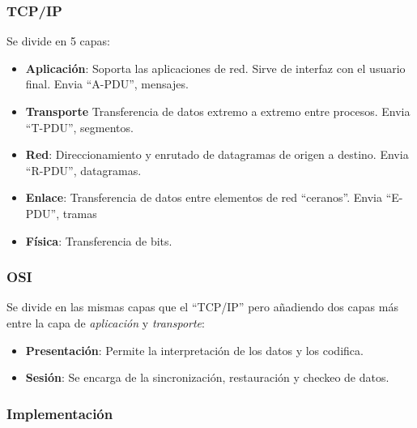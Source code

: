 \subsubsection{TCP/IP}
\noindent Se divide en 5 capas:
\begin{itemize}
        \item \textbf{Aplicación}: Soporta las aplicaciones de red. Sirve de interfaz con el usuario final. Envia ``A-PDU'', mensajes.
        \item \textbf{Transporte} Transferencia de datos extremo a extremo entre procesos. Envia ``T-PDU'', segmentos.
        \item \textbf{Red}: Direccionamiento y enrutado de datagramas de origen a destino. Envia ``R-PDU'', datagramas.
        \item \textbf{Enlace}: Transferencia de datos entre elementos de red ``ceranos''. Envia ``E-PDU'', tramas
        \item \textbf{Física}: Transferencia de bits.
\end{itemize}
\subsubsection{OSI}
\noindent Se divide en las mismas capas que el ``TCP/IP'' pero añadiendo dos capas más entre la capa de \textit{aplicación} y \textit{transporte}:
\begin{itemize}
        \item \textbf{Presentación}: Permite la interpretación de los datos y los codifica.
        \item \textbf{Sesión}: Se encarga de la sincronización, restauración y checkeo de datos.
\end{itemize}
\subsubsection{Implementación}
\noindent